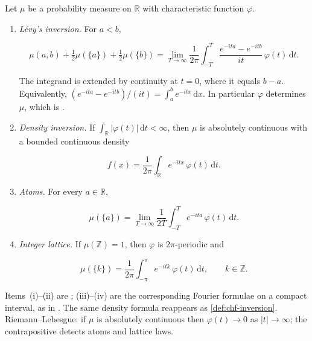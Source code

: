 \documentclass[11pt,a4paper]{article}
\begin{document}
\begin{theorem}
\label{thm:chf-inversion}
Let \(\mu\) be a probability measure on \(\mathbb{R}\) with characteristic function \(\varphi\).

\begin{enumerate}[label=\textup{(\roman*)}]
    \item
    \emph{L\'evy's inversion.} For \(a<b\),

\[
\mu(a,b)+\tfrac12\mu(\{a\})+\tfrac12\mu(\{b\})
=
\lim_{T\to\infty}
\frac{1}{2\pi}
\int_{-T}^{T}
\frac{e^{-ita}-e^{-itb}}{it}\,\varphi(t)\,\mathrm{d}t.
\]

The integrand is extended by continuity at \(t=0\), where it equals \(b-a\). Equivalently, \((e^{-ita}-e^{-itb})/(it)=\int_{a}^{b}e^{-itx}\,\mathrm{d}x\). In particular \(\varphi\) determines \(\mu\), which is \citep[Theorem~3.3.2]{durrett2010}.

    \item
    \emph{Density inversion.} If \(\int_{\mathbb{R}}|\varphi(t)|\,\mathrm{d}t<\infty\), then \(\mu\) is absolutely continuous with a bounded continuous density

\[
f(x)
=
\frac{1}{2\pi}
\int_{\mathbb{R}} e^{-itx}\,\varphi(t)\,\mathrm{d}t.
\]

    \item
    \emph{Atoms.} For every \(a\in\mathbb{R}\),

\[
\mu(\{a\})
=
\lim_{T\to\infty}
\frac{1}{2T}
\int_{-T}^{T} e^{-ita}\,\varphi(t)\,\mathrm{d}t.
\]

    \item
    \emph{Integer lattice.} If \(\mu(\mathbb{Z})=1\), then \(\varphi\) is \(2\pi\)-periodic and

\[
\mu(\{k\})
=
\frac{1}{2\pi}
\int_{-\pi}^{\pi} e^{-itk}\,\varphi(t)\,\mathrm{d}t,
\qquad
k\in\mathbb{Z}.
\]
\end{enumerate}

Items~(i)--(ii) are \citep[Theorems~3.3.4 and~3.3.5]{durrett2010}; (iii)--(iv) are the corresponding Fourier formulae on a compact interval, as in \citep[Chapter~6]{chung1968}. The same density formula reappears as \cref{def:chf-inversion}. Riemann--Lebesgue: if \(\mu\) is absolutely continuous then \(\varphi(t)\to 0\) as \(|t|\to\infty\); the contrapositive detects atoms and lattice laws.
\end{theorem}
\end{document}
